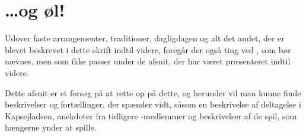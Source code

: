 \chapter{\ldots og øl!}
Udover faste arrangementer, traditioner, dagligdagen og alt det andet, der er blevet beskrevet i dette skrift indtil videre, foregår der også ting ved \TKET, som bør nævnes, men som ikke passer under de afsnit, der har været præsenteret indtil videre.

Dette afsnit er et forsøg på at rette op på dette, og herunder vil man kunne finde beskrivelser og fortællinger, der spænder vidt, såsom en beskrivelse af \TKETs deltagelse i Kapsejladsen, anekdoter fra tidligere \TK-medlemmer og beskrivelser af de spil, som hængerne ynder at spille.



\newpage







\newpage






